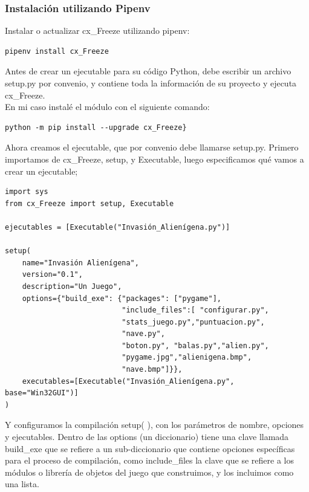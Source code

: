 \subsubsection*{Instalación utilizando Pipenv}

Instalar o actualizar {\ttfamily cx\_Freeze}  utilizando {\ttfamily pipenv}:
\begin{lstlisting}	
pipenv install cx_Freeze
\end{lstlisting}


Antes de crear un ejecutable para su código Python, debe escribir un archivo {\ttfamily setup.py} por convenio, y  contiene toda la 
información de su proyecto y ejecuta {\ttfamily cx\_Freeze}. \\


En mi caso instalé el módulo con el siguiente comando:   
\begin{lstlisting}
python -m pip install --upgrade cx_Freeze}
\end{lstlisting} 



Ahora creamos el ejecutable, que por convenio debe llamarse  {\ttfamily setup.py}.
Primero importamos de {\ttfamily cx\_Freeze},  {\ttfamily setup}, y   {\ttfamily Executable}, luego especificamos qué vamos a crear un ejecutable;


\hspace{-2.2cm}{\ttfamily \scriptsize  setup.py}  \vspace{-0.5cm}
\begin{lstlisting}			
import sys
from cx_Freeze import setup, Executable

ejecutables = [Executable("Invasión_Alienígena.py")]

setup(
    name="Invasión Alienígena",
    version="0.1",
    description="Un Juego",
    options={"build_exe": {"packages": ["pygame"],
                           "include_files":[ "configurar.py",
                           "stats_juego.py","puntuacion.py",
                           "nave.py",
                           "boton.py", "balas.py","alien.py",
                           "pygame.jpg","alienigena.bmp",
                           "nave.bmp"]}},
    executables=[Executable("Invasión_Alienígena.py", base="Win32GUI")]
)
\end{lstlisting}	
Y configuramos la compilación {\ttfamily setup( )}, con los parámetros de nombre, opciones y ejecutables.
Dentro de las  {\ttfamily options} (un diccionario)  tiene una clave llamada  {\ttfamily build\_exe} que se refiere a un sub-diccionario que contiene opciones específicas para el proceso de compilación, como  {\ttfamily include\_files} la clave que se refiere a los módulos  o librería de objetos del juego que construimos, y los incluimos como una lista. 


